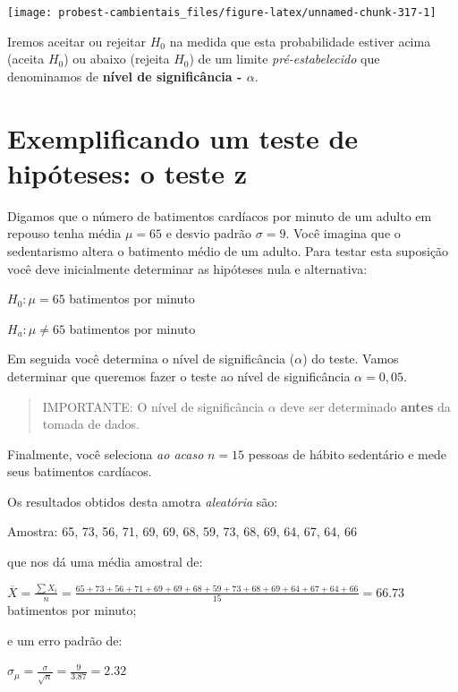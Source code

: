 \documentclass[
]{book}
\begin{document}
\begin{center}\texttt{[image: probest-cambientais\_files/figure-latex/unnamed-chunk-317-1]} \end{center}

Iremos aceitar ou rejeitar \(H_0\) na medida que esta probabilidade estiver acima (aceita \(H_0\)) ou abaixo (rejeita \(H_0\)) de um limite \emph{pré-estabelecido} que denominamos de \textbf{nível de significância - \(\alpha\)}.

\hypertarget{exemplificando-um-teste-de-hipuxf3teses-o-teste-z}{%
\section{Exemplificando um teste de hipóteses: o teste z}\label{exemplificando-um-teste-de-hipuxf3teses-o-teste-z}}

Digamos que o número de batimentos cardíacos por minuto de um adulto em repouso tenha média \(\mu = 65\) e desvio padrão \(\sigma = 9\). Você imagina que o sedentarismo altera o batimento médio de um adulto. Para testar esta suposição você deve inicialmente determinar as hipóteses nula e alternativa:

\(H_0: \mu = 65\) batimentos por minuto

\(H_a: \mu \ne 65\) batimentos por minuto

Em seguida você determina o nível de significância (\(\alpha\)) do teste. Vamos determinar que queremos fazer o teste ao nível de significância \(\alpha = 0,05\).

\begin{quote}
IMPORTANTE: O nível de significância \(\alpha\) deve ser determinado \textbf{antes} da tomada de dados.
\end{quote}

Finalmente, você seleciona \emph{ao acaso} \(n = 15\) pessoas de hábito sedentário e mede seus batimentos cardíacos.

Os resultados obtidos desta amotra \emph{aleatória} são:

Amostra: 65, 73, 56, 71, 69, 69, 68, 59, 73, 68, 69, 64, 67, 64, 66

que nos dá uma média amostral de:

\(\overline{X} = \frac{\sum{X_i}}{n} = \frac{65+73+56+71+69+69+68+59+73+68+69+64+67+64+66}{15} = 66.73\) batimentos por minuto;

e um erro padrão de:

\(\sigma_{\mu} = \frac{\sigma}{\sqrt{n}} = \frac{9}{3.87} = 2.32\)
\end{document}
